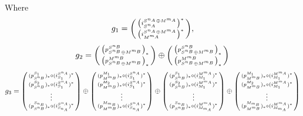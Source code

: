 \begin{remark}
    Where
    \[
        g_1 =
        \begin{psmallmatrix}
            \left(  i_{S^{n_A}}^{S^{n_A} \oplus M^{m_A}}  \right)^* \\
            \left(  i_{M^{m_A}}^{S^{n_A} \oplus M^{m_A}}  \right)^*
        \end{psmallmatrix},
    \]
    \[
        g_2 =
        \begin{psmallmatrix}
            \left(  p_{S^{n_B} \oplus M^{m_B}}^{S^{n_B}}  \right)_* \\
            \left(  p_{S^{n_B} \oplus M^{m_B}}^{M^{m_B}}  \right)_*
        \end{psmallmatrix}
        \oplus
        \begin{psmallmatrix}
            \left(  p_{S^{n_B} \oplus M^{m_B}}^{S^{n_B}}  \right)_* \\
            \left(  p_{S^{n_B} \oplus M^{m_B}}^{M^{m_B}}  \right)_*
        \end{psmallmatrix}
    \]
    \begin{multline*}
        g_3 =
        \begin{psmallmatrix}
            (p_{S^{n_B}}^{S_1})_* \circ (i_{S_1}^{S^{n_A}})^* \\
            (p_{S^{n_B}}^{S_2})_* \circ (i_{S_1}^{S^{n_A}})^* \\
            \vdots \\
            (p_{S^{n_B}}^{S_{n_B}})_* \circ (i_{S_{n_A}}^{S^{n_A}})^*
        \end{psmallmatrix}
        \oplus
        \begin{psmallmatrix}
            (p_{M^{m_B}}^{M_1})_* \circ (i_{S_1}^{S^{n_A}})^* \\
            (p_{M^{m_B}}^{M_2})_* \circ (i_{S_1}^{S^{n_A}})^* \\
            \vdots \\
            (p_{M^{m_B}}^{M_{m_B}})_* \circ (i_{S_{n_A}}^{S^{n_A}})^*
        \end{psmallmatrix}
        \oplus
        \begin{psmallmatrix}
            (p_{S^{n_B}}^{S_1})_* \circ (i_{M_1}^{M^{m_A}})^* \\
            (p_{S^{n_B}}^{S_2})_* \circ (i_{M_1}^{M^{m_A}})^* \\
            \vdots \\
            (p_{S^{n_B}}^{S_{n_B}})_* \circ (i_{M_{m_A}}^{M^{m_A}})^*
        \end{psmallmatrix}
        \oplus
        \begin{psmallmatrix}
            (p_{M^{m_B}}^{M_1})_* \circ (i_{M_1}^{M^{m_A}})^* \\
            (p_{M^{m_B}}^{M_2})_* \circ (i_{M_1}^{M^{m_A}})^* \\
            \vdots \\
            (p_{M^{m_B}}^{M_{m_B}})_* \circ (i_{M_{m_A}}^{M^{m_A}})^*
        \end{psmallmatrix}
    \end{multline*}


\end{remark}
